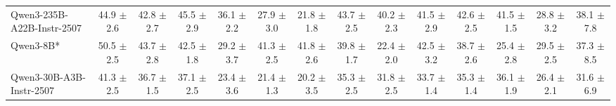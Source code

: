 \begin{table}[hbt]
{\begin{tabular}{l *{13}{c}}
Qwen3-235B-A22B-Instr-2507 &
44.9 {\tiny$\pm$ 2.6} &
42.8 {\tiny$\pm$ 2.7} &
45.5 {\tiny$\pm$ 2.9} &
36.1 {\tiny$\pm$ 2.2} &
27.9 {\tiny$\pm$ 3.0} &
21.8 {\tiny$\pm$ 1.8} &
43.7 {\tiny$\pm$ 2.5} &
40.2 {\tiny$\pm$ 2.3} &
41.5 {\tiny$\pm$ 2.9} &
42.6 {\tiny$\pm$ 2.5} &
41.5 {\tiny$\pm$ 1.5} &
28.8 {\tiny$\pm$ 3.2} &
38.1 {\tiny$\pm$ 7.8} \\

\rowcolor{gray!10}
Qwen3-8B* &
50.5 {\tiny$\pm$ 2.5} &
43.7 {\tiny$\pm$ 2.8} &
42.5 {\tiny$\pm$ 1.8} &
29.2 {\tiny$\pm$ 3.7} &
41.3 {\tiny$\pm$ 2.5} &
41.8 {\tiny$\pm$ 2.6} &
39.8 {\tiny$\pm$ 1.7} &
22.4 {\tiny$\pm$ 2.0} &
42.5 {\tiny$\pm$ 3.2} &
38.7 {\tiny$\pm$ 2.6} &
25.4 {\tiny$\pm$ 2.8} &
29.5 {\tiny$\pm$ 2.5} &
37.3 {\tiny$\pm$ 8.5} \\




Qwen3-30B-A3B-Instr-2507 &
41.3 {\tiny$\pm$ 2.5} &
36.7 {\tiny$\pm$ 1.5} &
37.1 {\tiny$\pm$ 2.5} &
23.4 {\tiny$\pm$ 3.6} &
21.4 {\tiny$\pm$ 1.3} &
20.2 {\tiny$\pm$ 3.5} &
35.3 {\tiny$\pm$ 2.5} &
31.8 {\tiny$\pm$ 2.5} &
33.7 {\tiny$\pm$ 1.4} &
35.3 {\tiny$\pm$ 1.4} &
36.1 {\tiny$\pm$ 1.9} &
26.4 {\tiny$\pm$ 2.1} &
31.6 {\tiny$\pm$ 6.9} \\


\end{tabular}}
\end{table}
